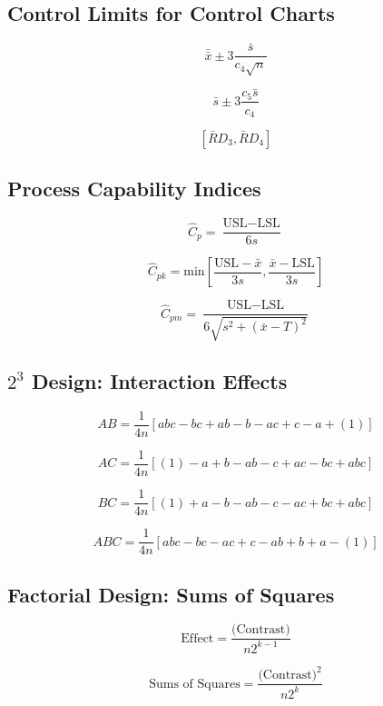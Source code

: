 \documentclass[a4paper,12pt]{article}
\begin{document}
\newpage
\large{
\subsection*{Control Limits for Control Charts}

 \[ \bar{\bar{x}} \pm 3\frac{\bar{s}}{c_4\sqrt{n}}\]

 \[ \bar{s} \pm 3\frac{c_5\bar{s}}{c_4}\]

 \[\left[ \bar{R}D_3, \bar{R}D_4\right]\]

\subsection*{Process Capability Indices}
\[ \hat{C}_p = \frac{\mbox{USL} - \mbox{LSL}}{6s}\]

\[ \hat{C}_{pk} = \mbox{min} \left[\frac{\mbox{USL} - \bar{x}}{3s},\frac{\bar{x} - \mbox{LSL}}{3s} \right] \]

\[ \hat{C}_{pm} = \frac{\mbox{USL} - \mbox{LSL}}{6\sqrt{s^2+(\bar{x}-T)^2}}\]
\bigskip
%
\subsection*{$2^3$ Design: Interaction Effects}

\[ AB = \frac{1}{4n} \left[ abc - bc + ab - b - ac + c - a + (1) \right] \]

\[ AC = \frac{1}{4n} \left[ (1) - a + b - ab -c + ac - bc + abc \right] \]

\[ BC = \frac{1}{4n} \left[ (1) + a - b - ab - c - ac + bc + abc \right] \]

\[ABC = \frac{1}{4n} \left[ abc - bc - ac + c - ab + b +  a - (1) \right] \]

\bigskip

\subsection*{Factorial Design: Sums of Squares}

\[\mbox{Effect} =  \frac{\mbox{(Contrast)}}{n2^{k-1}}\]

\[\mbox{Sums of Squares} =  \frac{\mbox{(Contrast)}^2}{n2^k}\]
}
\end{document}
